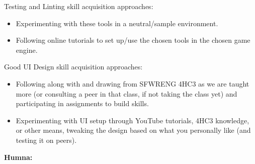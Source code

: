 \documentclass{scrreprt}
\theoremstyle{definition}
\begin{document}
\begin{enumerate}
		Testing and Linting skill acquisition approaches:
		\begin{itemize}
			\item Experimenting with these tools in a neutral/sample environment.
			\item Following online tutorials to set up/use the chosen tools in the chosen game engine.
		\end{itemize}

		Good UI Design skill acquisition approaches:
		\begin{itemize}
			\item Following along with and drawing from SFWRENG 4HC3 as we are taught more (or consulting a peer in that
			class, if not taking the class yet) and participating in assignments to build skills.
			\item Experimenting with UI setup through YouTube tutorials, 4HC3 knowledge, or other means, tweaking the
			design based on what you personally like (and testing it on peers).
		\end{itemize}
	\end{enumerate}
	
	\textbf{Humna:}
	
\end{document}
